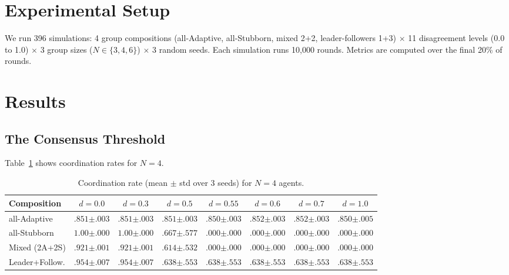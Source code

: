 \documentclass[11pt]{article}
\begin{document}
\section{Experimental Setup}

We run 396 simulations: 4 group compositions (all-Adaptive, all-Stubborn, mixed 2+2, leader-followers 1+3) $\times$ 11 disagreement levels (0.0 to 1.0) $\times$ 3 group sizes ($N \in \{3, 4, 6\}$) $\times$ 3 random seeds.
Each simulation runs 10{,}000 rounds.
Metrics are computed over the final 20\% of rounds.

\section{Results}

\subsection{The Consensus Threshold}

Table~\ref{tab:main} shows coordination rates for $N = 4$.

\begin{table}[h]
\centering
\caption{Coordination rate (mean $\pm$ std over 3 seeds) for $N = 4$ agents.}
\label{tab:main}
\small
\begin{tabular}{lccccccc}
\toprule
Composition & $d{=}0.0$ & $d{=}0.3$ & $d{=}0.5$ & $d{=}0.55$ & $d{=}0.6$ & $d{=}0.7$ & $d{=}1.0$ \\
\midrule
all-Adaptive    & $.851 {\scriptstyle\pm .003}$ & $.851 {\scriptstyle\pm .003}$ & $.851 {\scriptstyle\pm .003}$ & $.850 {\scriptstyle\pm .003}$ & $.852 {\scriptstyle\pm .003}$ & $.852 {\scriptstyle\pm .003}$ & $.850 {\scriptstyle\pm .005}$ \\
all-Stubborn    & $1.00 {\scriptstyle\pm .000}$ & $1.00 {\scriptstyle\pm .000}$ & $.667 {\scriptstyle\pm .577}$ & $.000 {\scriptstyle\pm .000}$ & $.000 {\scriptstyle\pm .000}$ & $.000 {\scriptstyle\pm .000}$ & $.000 {\scriptstyle\pm .000}$ \\
Mixed (2A+2S)   & $.921 {\scriptstyle\pm .001}$ & $.921 {\scriptstyle\pm .001}$ & $.614 {\scriptstyle\pm .532}$ & $.000 {\scriptstyle\pm .000}$ & $.000 {\scriptstyle\pm .000}$ & $.000 {\scriptstyle\pm .000}$ & $.000 {\scriptstyle\pm .000}$ \\
Leader+Follow.  & $.954 {\scriptstyle\pm .007}$ & $.954 {\scriptstyle\pm .007}$ & $.638 {\scriptstyle\pm .553}$ & $.638 {\scriptstyle\pm .553}$ & $.638 {\scriptstyle\pm .553}$ & $.638 {\scriptstyle\pm .553}$ & $.638 {\scriptstyle\pm .553}$ \\
\bottomrule
\end{tabular}
\end{table}
\end{document}
